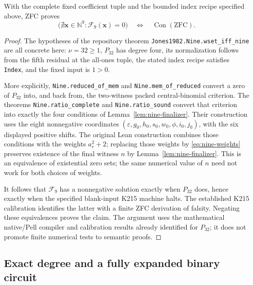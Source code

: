 \begin{theorem}
\label{thm:nine-consistency}
With the complete fixed coefficient tuple and the bounded index recipe
specified above, ZFC proves
\[
 \bigl(\nexists\mathbf x\in\mathbb N^9:
                   \mathcal F_9(\mathbf x)=0\bigr)
 \quad\Longleftrightarrow\quad\operatorname{Con}(\mathrm{ZFC}).
\]
\end{theorem}
\begin{proof}
The hypotheses of the repository theorem
\texttt{Jones1982.Nine.wset\_iff\_nine} are all concrete here:
$\nu=32\geq1$, $P_{32}$ has degree four, its normalization follows
from the fifth residual at the all-ones tuple, the stated index recipe
satisfies \texttt{Index}, and the fixed input is $1>0$.

More explicitly, \texttt{Nine.reduced\_of\_mem} and
\texttt{Nine.mem\_of\_reduced} convert a zero of $P_{32}$ into,
and back from, the two-witness packed central-binomial criterion.
The theorems \texttt{Nine.ratio\_complete} and
\texttt{Nine.ratio\_sound} convert that criterion into exactly the
four conditions of Lemma~\ref{lem:nine-finalizer}.  Their construction
uses the eight nonnegative coordinates
$(\varepsilon,g_0,h_0,s_0,w_0,\phi,i_0,j_0)$, with the six displayed
positive shifts.  The original Lean construction combines those
conditions with the weights $a_r^2+2$; replacing those weights by
\eqref{eq:nine-weights} preserves existence of the final witness $n$
by Lemma~\ref{lem:nine-finalizer}.
This is an equivalence of existential zero sets; the same numerical
value of $n$ need not work for both choices of weights.

It follows that $\mathcal F_9$ has a nonnegative solution exactly when
$P_{32}$ does, hence exactly when the specified blank-input K215
machine halts.  The established K215 calibration identifies the latter
with a finite ZFC derivation of falsity.  Negating these equivalences
proves the claim.  The argument uses the mathematical native/Pell
compiler and calibration results already identified for $P_{32}$;
it does not promote finite numerical tests to semantic proofs.
\end{proof}

\subsection{Exact degree and a fully expanded binary circuit}

